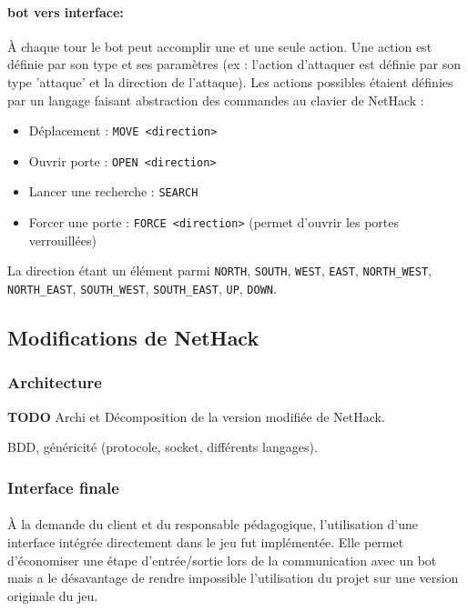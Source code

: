 \documentclass[a4paper,12pt]{article}
\begin{document}
\paragraph{bot vers interface:} À chaque tour le bot peut accomplir une et une seule action. Une action est définie par son type et ses paramètres (ex : l'action d'attaquer est définie par son type 'attaque' et la direction de l'attaque). Les actions possibles étaient définies par un langage faisant abstraction des commandes au clavier de NetHack :
\begin{itemize}
	\item Déplacement : \verb!MOVE <direction>!
	\item Ouvrir porte : \verb!OPEN <direction>!
	\item Lancer une recherche : \verb!SEARCH!
	\item Forcer une porte : \verb!FORCE <direction>! (permet d'ouvrir les portes verrouillées)
\end{itemize}
\noindent La direction étant un élément parmi \verb!NORTH!, \verb!SOUTH!, \verb!WEST!, \verb!EAST!, \verb!NORTH_WEST!, \verb!NORTH_EAST!, \verb!SOUTH_WEST!, \verb!SOUTH_EAST!, \verb!UP!, \verb!DOWN!.


\subsection{Modifications de NetHack}

\subsubsection{Architecture}

\textbf{TODO}
Archi et Décomposition de la version modifiée de NetHack.

BDD, généricité (protocole, socket, différents langages).

\subsubsection{Interface finale}

\paragraph{}À la demande du client et du responsable pédagogique, l'utilisation d'une interface intégrée directement dans le jeu fut implémentée. Elle permet d'économiser une étape d'entrée/sortie lors de la communication avec un bot mais a le désavantage de rendre impossible l'utilisation du projet sur une version originale du jeu.
\end{document}
